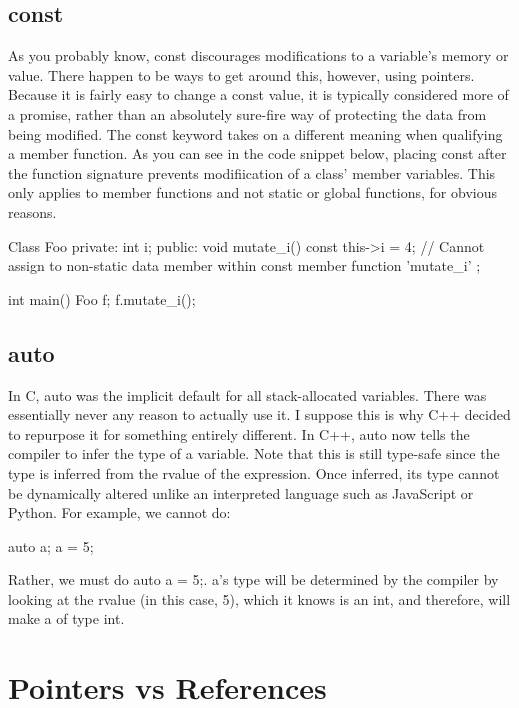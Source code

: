 \documentclass{article}
\begin{document}
\subsection{const}

As you probably know, const discourages modifications to a variable's memory or value. There happen to be
ways to get around this, however, using pointers. Because it is fairly easy to change a const value, it is
typically considered more of a promise, rather than an absolutely sure-fire way of protecting the data from
being modified. The const keyword takes on a different meaning when qualifying a member function. As you can
see in the code snippet below, placing const after the function signature prevents modifiication of a class'
member variables. This only applies to member functions and not static or global functions, for obvious
reasons.

\begin{cpplst}
Class Foo {
private:
    int i;
public:
    void mutate_i() const {
		this->i = 4; // Cannot assign to non-static data member within const member function 'mutate_i'
	}
};

int main() {
    Foo f;
	f.mutate_i();
}
\end{cpplst}

\subsection{auto}

In C, auto was the implicit default for all stack-allocated variables. There was essentially never any reason
to actually use it. I suppose this is why C++ decided to repurpose it for something entirely different. In
C++, auto now tells the compiler to infer the type of a variable. Note that this is still type-safe since the
type is inferred from the rvalue of the expression. Once inferred, its type cannot be dynamically altered unlike
an interpreted language such as JavaScript or Python. For example, we cannot do:

\begin{cpplst}
auto a;
a = 5;
\end{cpplst}

Rather, we must do auto a = 5;. a's type will be determined by the compiler by looking at the rvalue (in this
case, 5), which it knows is an int, and therefore, will make a of type int.

\section{Pointers vs References}
\end{document}
